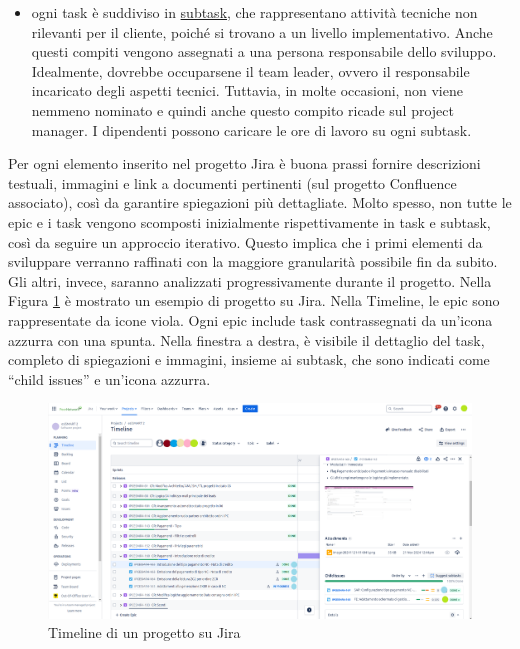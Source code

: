 \begin{itemize}
            \item ogni task è suddiviso in \underline{subtask}, che rappresentano attività tecniche non rilevanti per il cliente, poiché si trovano a un livello
            implementativo. Anche questi compiti vengono assegnati a una persona responsabile dello sviluppo. Idealmente, dovrebbe occuparsene il team leader, ovvero il
            responsabile incaricato degli aspetti tecnici. Tuttavia, in molte occasioni, non viene nemmeno
            nominato e quindi anche questo compito ricade sul project manager. I dipendenti possono caricare le ore di lavoro su ogni subtask.
        \end{itemize}

        Per ogni elemento inserito nel progetto Jira è buona prassi fornire descrizioni testuali, immagini e link a documenti pertinenti
        (sul progetto Confluence associato), così da garantire spiegazioni più dettagliate.
        Molto spesso, non tutte le epic e i task vengono scomposti inizialmente rispettivamente in task e subtask, così da seguire un approccio iterativo.
        Questo implica che i primi elementi da sviluppare verranno raffinati con la maggiore granularità possibile fin da subito. Gli altri, invece,
        saranno analizzati progressivamente durante il progetto.
        Nella Figura \ref{fig:timeline-jira-progetto} è mostrato un esempio di progetto su Jira. Nella Timeline, le epic sono rappresentate da icone viola. Ogni epic include task
        contrassegnati da un'icona azzurra con una spunta. Nella finestra a destra, è visibile il dettaglio del task, completo di spiegazioni e immagini,
        insieme ai subtask, che sono indicati come “child issues” e un'icona azzurra.
        
        \begin{figure}
            \centering
            \includegraphics[width=\linewidth]{figures/timelineJira.png}
            \caption{Timeline di un progetto su Jira}
            \label{fig:timeline-jira-progetto}
        \end{figure}

